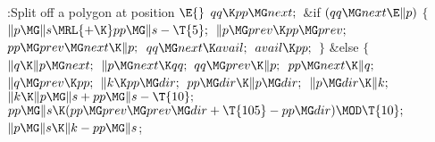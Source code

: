 \B{}:Split off a polygon at position %
\X${}\E{}$\6
$\\{qq}\K\\{pp}\MG\\{next};{}$\6
\&{if} ${}(\\{qq}\MG\\{next}\E\|p){}$\5
${}\{{}$\1\6
${}\|p\MG\|s\MRL{+{\K}}\\{pp}\MG\|s-\T{5};{}$\6
${}\|p\MG\\{prev}\K\\{pp}\MG\\{prev};{}$\6
${}\\{pp}\MG\\{prev}\MG\\{next}\K\|p;{}$\6
${}\\{qq}\MG\\{next}\K\\{avail};{}$\6
${}\\{avail}\K\\{pp};{}$\6
\4${}\}{}$\2\6
\&{else}\5
${}\{{}$\1\6
${}\|q\K\|p\MG\\{next};{}$\6
${}\|p\MG\\{next}\K\\{qq};{}$\6
${}\\{qq}\MG\\{prev}\K\|p;{}$\6
${}\\{pp}\MG\\{next}\K\|q;{}$\6
${}\|q\MG\\{prev}\K\\{pp};{}$\6
${}\|k\K\\{pp}\MG\\{dir};{}$\6
${}\\{pp}\MG\\{dir}\K\|p\MG\\{dir};{}$\6
${}\|p\MG\\{dir}\K\|k;{}$\6
${}\|k\K\|p\MG\|s+\\{pp}\MG\|s-\T{10};{}$\6
${}\\{pp}\MG\|s\K(\\{pp}\MG\\{prev}\MG\\{prev}\MG\\{dir}+\T{105}-\\{pp}\MG%
\\{dir})\MOD\T{10};{}$\6
${}\|p\MG\|s\K\|k-\\{pp}\MG\|s{}$;\6
